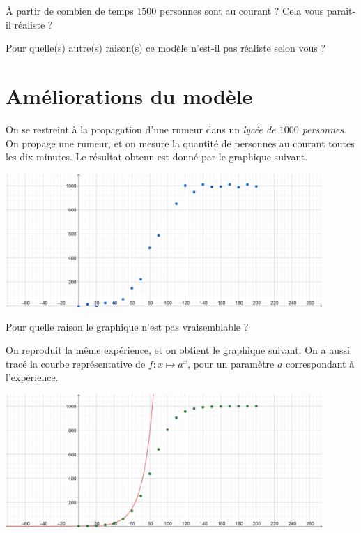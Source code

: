 \documentclass{exam}
\begin{document}
\begin{questions}
\question À partir de combien de temps $1500$ personnes sont au courant ? Cela vous paraît-il réaliste ?

\makeemptybox{4cm}
\question 
Pour quelle(s) autre(s) raison(s) ce modèle n'est-il pas réaliste selon vous ?

\makeemptybox{4cm}
\newpage
\section{Améliorations du modèle}
\question On se restreint à la propagation d'une rumeur dans un \emph{lycée de $1000$ personnes}. On propage une rumeur, et on mesure la quantité de personnes au courant toutes les dix minutes. Le résultat obtenu est donné par le graphique suivant.
\begin{center}
\includegraphics[width=0.9\textwidth]{Modele_sin.png}    
\end{center}
Pour quelle raison le graphique n'est pas vraisemblable ?

\makeemptybox{3cm}
\question On reproduit la même expérience, et on obtient le graphique suivant. On a aussi tracé la courbe représentative de $f : x \mapsto a^x$, pour un paramètre $a$ correspondant à l'expérience.
\begin{center}
\includegraphics[width=0.9\textwidth]{modele_logistique.png}
\end{center}
\end{questions}
\end{document}
